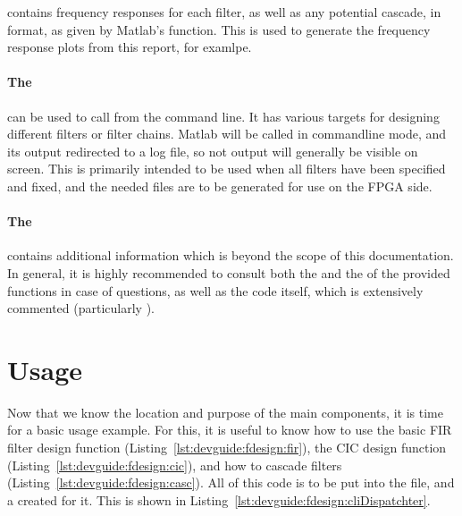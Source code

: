  contains frequency  responses for each filter, as  well as any
potential cascade, in  format,  as given by Matlab's 
function.  This  is used to  generate the  frequency response plots  from this
report, for examlpe.

\paragraph{The  } can  be used  to call  
from the command line. It has  various targets for designing different filters
or filter  chains. Matlab will be called  in commandline mode, and  its output
redirected  to  a  log file,  so  not  output  will  generally be  visible  on
screen. This  is primarily  intended to  be used  when all  filters have  been
specified and fixed, and  the needed files are to be generated  for use on the
FPGA side.

\paragraph{The  }  contains  additional information  which  is
beyond the scope  of this documentation. In general, it  is highly recommended
to  consult  both  the    and the    of  the  provided
functions  in  case  of questions,  as  well  as  the  code itself,  which  is
extensively commented (particularly ).


\section{Usage} %
\label{sec:devguide:filter_toolchain:usage}

Now that we know  the location and purpose of the main  components, it is time
for a basic usage example. For this, it is useful to know how to use the basic
FIR filter  design function (Listing~\ref{lst:devguide:fdesign:fir}),  the CIC
design function  (Listing~\ref{lst:devguide:fdesign:cic}), and how  to cascade
filters (Listing~\ref{lst:devguide:fdesign:casc}). All  of this code is  to be
put  into  the   file,  and  a   created  for
it. This is shown in Listing~\ref{lst:devguide:fdesign:cliDispatchter}.


